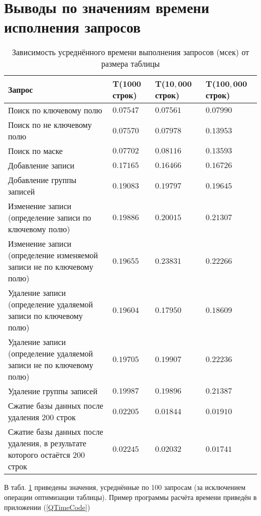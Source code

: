 \documentclass[zuevDbReport.tex]{subfiles}
\begin{document}
\newpage
\section{Выводы по значениям времени исполнения запросов}
\begin{table}[H]
\begin{center}
\caption{\label{resTab}Зависимость усреднённого времени выполнения запросов (мсек) от размера таблицы}
\begin{tabular}{| p{} |p{}|p{}|p{}|}
\hline
\textbf{Запрос}&\textbf{T($\mathbf{1000}$ строк)}& \textbf{T($\mathbf{10,000}$ строк)}&\textbf{T($\mathbf{100,000}$ строк)}\\
\hline
Поиск по ключевому полю&$0.07547$&$0.07561$&$0.07990$\\
\hline
Поиск по не ключевому полю&$0.07570$&$0.07978$&$0.13953$\\
\hline
Поиск по маске&$0.07702$&$0.08116$&$0.13593$\\
\hline
Добавление записи&$0.17165$&$0.16466$&$0.16726$\\
\hline
Добавление группы записей&$0.19083$&$0.19797$&$0.19645$\\
\hline
Изменение записи (определение записи по ключевому полю)&$0.19886$&$0.20015$&$0.21307$\\
\hline
Изменение записи (определение изменяемой записи не по ключевому полю)&$0.19655$&$0.23831$&$0.22266$\\
\hline
Удаление записи (определение удаляемой записи по ключевому полю)&$0.19604$&$0.17950$&$0.18609$\\
\hline
Удаление записи (определение удаляемой записи не по ключевому полю)&$0.19705$&$0.19907$&$0.22236$\\
\hline
Удаление группы записей&$0.19987$&$0.19896$&$0.21387$\\
\hline
Сжатие базы данных после удаления 200 строк&$0.02205$&$0.01844$&$0.01910$\\
\hline
Сжатие базы данных после удаления, в результате которого остаётся 200 строк&$0.02245$&$0.02032$&$0.01741$\\
\hline
\end{tabular}
\end{center}
\end{table}
В табл. \ref{resTab} приведены значения, усреднённые по 100 запросам (за исключением операции оптимизации таблицы). Пример программы расчёта времени приведён в приложении (\ref{QTimeCode})\\
\end{document}
